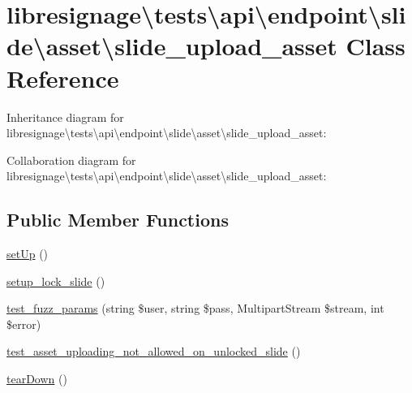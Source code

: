 \hypertarget{classlibresignage_1_1tests_1_1api_1_1endpoint_1_1slide_1_1asset_1_1slide__upload__asset}{}\section{libresignage\textbackslash{}tests\textbackslash{}api\textbackslash{}endpoint\textbackslash{}slide\textbackslash{}asset\textbackslash{}slide\+\_\+upload\+\_\+asset Class Reference}
\label{classlibresignage_1_1tests_1_1api_1_1endpoint_1_1slide_1_1asset_1_1slide__upload__asset}


Inheritance diagram for libresignage\textbackslash{}tests\textbackslash{}api\textbackslash{}endpoint\textbackslash{}slide\textbackslash{}asset\textbackslash{}slide\+\_\+upload\+\_\+asset\+:


Collaboration diagram for libresignage\textbackslash{}tests\textbackslash{}api\textbackslash{}endpoint\textbackslash{}slide\textbackslash{}asset\textbackslash{}slide\+\_\+upload\+\_\+asset\+:
\subsection*{Public Member Functions}
\begin{DoxyCompactItemize}
\item 
\hyperlink{classlibresignage_1_1tests_1_1api_1_1endpoint_1_1slide_1_1asset_1_1slide__upload__asset_aa00f3d851859e92fb8548f83f3a07578}{set\+Up} ()
\item 
\hyperlink{classlibresignage_1_1tests_1_1api_1_1endpoint_1_1slide_1_1asset_1_1slide__upload__asset_a9bbaf20407e6360e511750e490dd667c}{setup\+\_\+lock\+\_\+slide} ()
\item 
\hyperlink{classlibresignage_1_1tests_1_1api_1_1endpoint_1_1slide_1_1asset_1_1slide__upload__asset_aec12095fcf316836e34be618bf8531b5}{test\+\_\+fuzz\+\_\+params} (string \$user, string \$pass, Multipart\+Stream \$stream, int \$error)
\item 
\hyperlink{classlibresignage_1_1tests_1_1api_1_1endpoint_1_1slide_1_1asset_1_1slide__upload__asset_a50b6a69be98c1ca48de4382b0b201b54}{test\+\_\+asset\+\_\+uploading\+\_\+not\+\_\+allowed\+\_\+on\+\_\+unlocked\+\_\+slide} ()
\item 
\hyperlink{classlibresignage_1_1tests_1_1api_1_1endpoint_1_1slide_1_1asset_1_1slide__upload__asset_aa3e14002f8af7b58a86d62a85177e5ce}{tear\+Down} ()
\end{DoxyCompactItemize}
